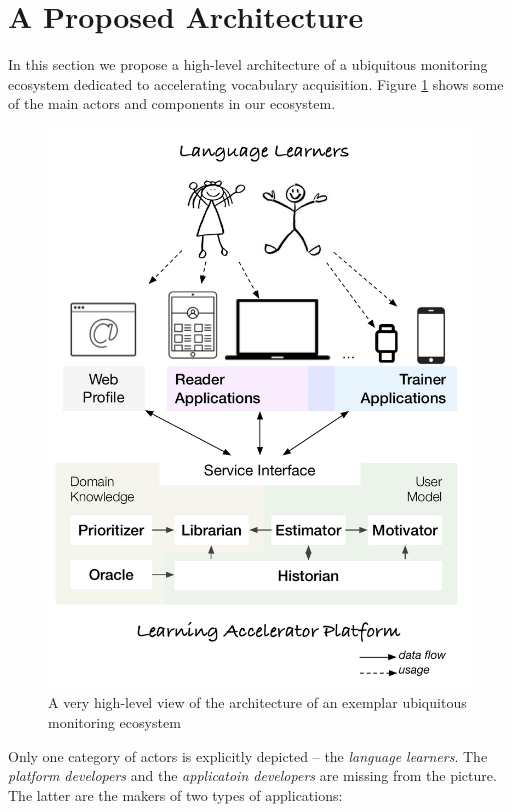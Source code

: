 

\section {A Proposed Architecture}
In this section we propose a high-level architecture of a ubiquitous monitoring ecosystem dedicated to accelerating vocabulary acquisition. 
Figure \ref{fig:architecture} shows some of the main actors and components in our ecosystem.

\begin{figure}[h!]
	\includegraphics[width=0.99\linewidth]{images/zeeguu-architecture.pdf}
	\caption{A very high-level view of the architecture of an exemplar ubiquitous monitoring ecosystem}
	\label{fig:architecture}
\end{figure}

Only one category of actors is explicitly depicted -- the {\em language learners}. The {\em platform developers} and the {\em applicatoin developers} are missing from the picture. The latter are the makers of two types of applications: 

